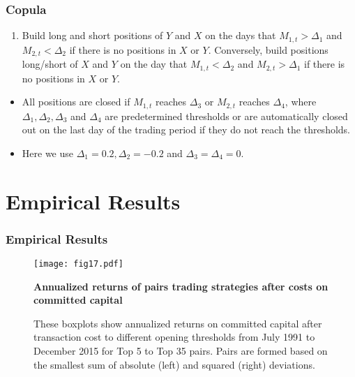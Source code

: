 \documentclass[pdf,9pt,xcolor=dvipsnames,hide notes]{beamer}
\begin{document}
\begin{frame}[label=frame4i]
	\frametitle{Copula}
	
	\begin{enumerate}[(4)]
		\justifying
		
		\item Build long and short positions of $Y$ and $X$ on the days that $M_{1,t}>\Delta_{1}$ and $M_{2,t}<\Delta_{2}$ if there is no positions in $X$ or $Y$. Conversely, build positions long/short of $X$ and $Y$ on the day that $M_{1,t}<\Delta_{2}$ and $M_{2,t}>\Delta_{1}$ if there is no positions in $X$ or $Y$. 
		
		\end{enumerate}
	
	
	\vspace{0.3cm}
		
		\begin{itemize}
			\item  All positions are closed if $M_{1,t}$ reaches $\Delta_{3}$ or $M_{2,t}$ reaches $\Delta_{4}$, where $\Delta_{1},\Delta_{2},\Delta_{3}$ and $\Delta_{4}$ are predetermined thresholds or are automatically closed out on the last day of the trading period if they do not reach the thresholds. 
			
			\vspace{0.3cm}
			
			\item Here we use $\Delta_{1}=0.2, \Delta_{2}=-0.2$ and $\Delta_{3}=\Delta_{4}=0$.
			
			\end{itemize}
		
	
\end{frame}

\section{Empirical Results}


\begin{frame}
	\frametitle{Empirical Results}
	
		\begin{figure}[H]
		\centering
		\texttt{[image: fig17.pdf]}
		\caption{\textbf{Annualized returns of pairs trading strategies after costs on committed capital}}
		\caption*{\justifying \tiny These boxplots show annualized returns on committed capital after transaction cost to different opening thresholds from July 1991 to December 2015 for Top 5 to Top 35 pairs. Pairs are formed based on the smallest sum of absolute (left) and squared (right) deviations.}
		\label{fig:fig17}
	\end{figure}

\end{frame}
%
\end{document}
